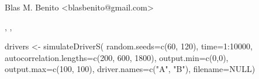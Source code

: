 \documentclass[letterpaper]{book}
\begin{document}
%
\begin{Author}\relax
Blas M. Benito  <blasbenito@gmail.com>
\end{Author}
%
\begin{SeeAlso}\relax
{}, , 
\end{SeeAlso}
%
\begin{Examples}
\begin{ExampleCode}

drivers <- simulateDriverS(
 random.seeds=c(60, 120),
 time=1:10000,
 autocorrelation.lengths=c(200, 600, 1800),
 output.min=c(0,0),
 output.max=c(100, 100),
 driver.names=c("A", "B"),
 filename=NULL)

\end{ExampleCode}
\end{Examples}
%
\end{document}
